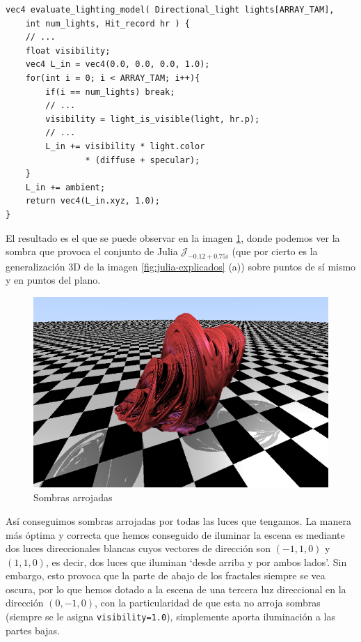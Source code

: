 \begin{lstlisting}
vec4 evaluate_lighting_model( Directional_light lights[ARRAY_TAM], 
    int num_lights, Hit_record hr ) {
    // ... 
    float visibility;
    vec4 L_in = vec4(0.0, 0.0, 0.0, 1.0);
    for(int i = 0; i < ARRAY_TAM; i++){
        if(i == num_lights) break;
        // ... 
        visibility = light_is_visible(light, hr.p);
        // ... 
        L_in += visibility * light.color 
                * (diffuse + specular);
    }
    L_in += ambient;
    return vec4(L_in.xyz, 1.0);
}
\end{lstlisting}

El resultado es el que se puede observar en la imagen \ref{fig:sombra-sin-suavizado}, donde podemos ver la sombra que provoca el conjunto de Julia $\mathcal{J}_{-0.12+0.75i}$ (que por cierto es la generalización 3D de la imagen \ref{fig:julia-explicados} (a)) sobre puntos de sí mismo y en puntos del plano.

\begin{figure} [ht]
    \centering
    \includegraphics[scale = 0.45]{img/C8/sombra-1.png}
    \caption{Sombras arrojadas}
    \label{fig:sombra-sin-suavizado}
\end{figure}

Así conseguimos sombras arrojadas por todas las luces que tengamos. La manera más óptima y correcta que hemos conseguido de iluminar la escena es mediante dos luces direccionales blancas cuyos vectores de dirección son $(-1,1,0)$ y $(1,1,0)$, es decir, dos luces que iluminan `desde arriba y por ambos lados'. Sin embargo, esto provoca que la parte de abajo de los fractales siempre se vea oscura, por lo que hemos dotado a la escena de una tercera luz direccional en la dirección $(0,-1,0)$, con la particularidad de que esta no arroja sombras (siempre se le asigna \verb|visibility=1.0|), simplemente aporta iluminación a las partes bajas.

